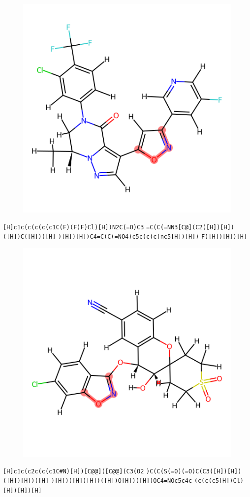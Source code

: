 \documentclass{article}
\begin{document}
\begin{figure}[ht]
\centering
    \includegraphics{mol18.png}
\end{figure}
\verb|[H]c1c(c(c(c(c1C(F)(F)F)Cl)[H])N2C(=O)C3| \verb|=C(C(=NN3[C@](C2([H])[H])([H])C([H])([H]| \verb|)[H])[H])C4=C(C(=NO4)c5c(c(c(nc5[H])[H])| \verb|F)[H])[H])[H]|

\begin{figure}[ht]
\centering
    \includegraphics{mol19.png}
\end{figure}
\verb|[H]c1c(c2c(c(c1C#N)[H])[C@@]([C@@](C3(O2| \verb|)C(C(S(=O)(=O)C(C3([H])[H])([H])[H])([H]| \verb|)[H])([H])[H])([H])O[H])([H])OC4=NOc5c4c| \verb|(c(c(c5[H])Cl)[H])[H])[H]|
\end{document}
